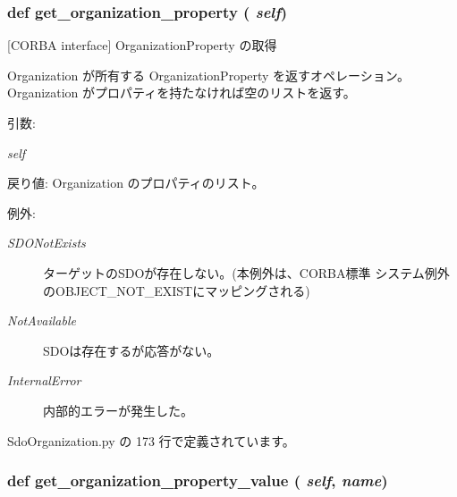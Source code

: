 \subsubsection{\setlength{\rightskip}{0pt plus 5cm}def get\_\-organization\_\-property ( {\em self})}\label{classsource__py_1_1_sdo_organization_1_1_organization__impl_92dc9868487ca6b34031dde9ba4c341a}


[CORBA interface] OrganizationProperty の取得 

Organization が所有する OrganizationProperty を返すオペレーション。 Organization がプロパティを持たなければ空のリストを返す。

\begin{Desc}
\item[引数:]
\begin{description}
\item[{\em self}]\end{description}
\end{Desc}
\begin{Desc}
\item[戻り値:]Organization のプロパティのリスト。\end{Desc}
\begin{Desc}
\item[例外:]
\begin{description}
\item[{\em SDONotExists}]ターゲットのSDOが存在しない。(本例外は、CORBA標準 システム例外のOBJECT\_\-NOT\_\-EXISTにマッピングされる) \item[{\em NotAvailable}]SDOは存在するが応答がない。 \item[{\em InternalError}]内部的エラーが発生した。 \end{description}
\end{Desc}


 SdoOrganization.py の 173 行で定義されています。
\subsubsection{\setlength{\rightskip}{0pt plus 5cm}def get\_\-organization\_\-property\_\-value ( {\em self},  {\em name})}\label{classsource__py_1_1_sdo_organization_1_1_organization__impl_59fb26a2ac77e05d2d23cce9413fe96d}


